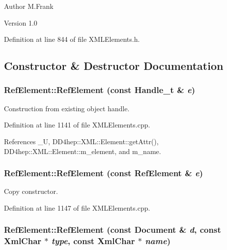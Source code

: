 \begin{DoxyAuthor}{Author}
M.Frank 
\end{DoxyAuthor}
\begin{DoxyVersion}{Version}
1.0 
\end{DoxyVersion}


Definition at line 844 of file XMLElements.h.

\subsection{Constructor \& Destructor Documentation}
\hypertarget{class_d_d4hep_1_1_x_m_l_1_1_ref_element_a59a0e1ae7ebec907fd7df64528fcb654}{
\subsubsection[{RefElement}]{\setlength{\rightskip}{0pt plus 5cm}RefElement::RefElement (const {\bf Handle\_\-t} \& {\em e})}}
\label{class_d_d4hep_1_1_x_m_l_1_1_ref_element_a59a0e1ae7ebec907fd7df64528fcb654}


Construction from existing object handle. 

Definition at line 1141 of file XMLElements.cpp.

References \_\-U, DD4hep::XML::Element::getAttr(), DD4hep::XML::Element::m\_\-element, and m\_\-name.\hypertarget{class_d_d4hep_1_1_x_m_l_1_1_ref_element_ab35b2b5265479d3876429a6b8a825a99}{
\subsubsection[{RefElement}]{\setlength{\rightskip}{0pt plus 5cm}RefElement::RefElement (const {\bf RefElement} \& {\em e})}}
\label{class_d_d4hep_1_1_x_m_l_1_1_ref_element_ab35b2b5265479d3876429a6b8a825a99}


Copy constructor. 

Definition at line 1147 of file XMLElements.cpp.\hypertarget{class_d_d4hep_1_1_x_m_l_1_1_ref_element_ad49f3b5422b4070c2fbb04622e94a208}{
\subsubsection[{RefElement}]{\setlength{\rightskip}{0pt plus 5cm}RefElement::RefElement (const {\bf Document} \& {\em d}, \/  const {\bf XmlChar} $\ast$ {\em type}, \/  const {\bf XmlChar} $\ast$ {\em name})}}
\label{class_d_d4hep_1_1_x_m_l_1_1_ref_element_ad49f3b5422b4070c2fbb04622e94a208}


